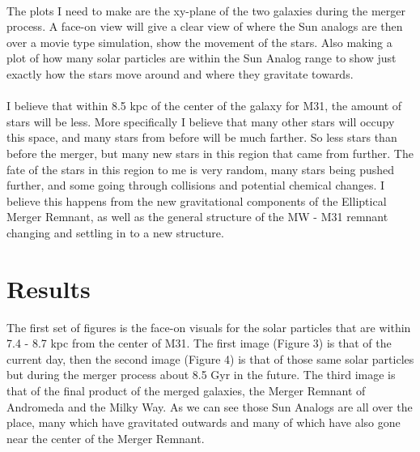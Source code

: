 \documentclass[fleqn,usenatbib]{mnras}
\begin{document}
\paragraph{}
The plots I need to make are the xy-plane of the two galaxies during the merger process. A face-on view will give a clear view of where the Sun analogs are then over a movie type simulation, show the movement of the stars. Also making a plot of how many solar particles are within the Sun Analog range to show just exactly how the stars move around and where they gravitate towards. 

\paragraph{}
I believe that within 8.5 kpc of the center of the galaxy for M31, the amount of stars will be less. More specifically I believe that many other stars will occupy this space, and many stars from before will be much farther. So less stars than before the merger, but many new stars in this region that came from further. The fate of the stars in this region to me is very random, many stars being pushed further, and some going through collisions and potential chemical changes. I believe this happens from the new gravitational components of the Elliptical Merger Remnant, as well as the general structure of the MW - M31 remnant changing and settling in to a new structure.

\section{Results}

The first set of figures is the face-on visuals for the solar particles that are within 7.4 - 8.7 kpc from the center of M31. The first image (Figure 3) is that of the current day, then the second image (Figure 4) is that of those same solar particles but during the merger process about 8.5 Gyr in the future. The third image is that of the final product of the merged galaxies, the Merger Remnant of Andromeda and the Milky Way. As we can see those Sun Analogs are all over the place, many which have gravitated outwards and many of which have also gone near the center of the Merger Remnant.
\end{document}
